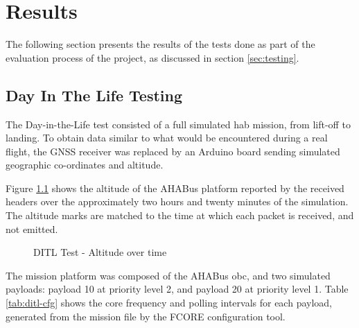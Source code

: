 \chapter{Results}
\label{ch:results}

The following section presents the results of the tests done as part of the
evaluation process of the project, as discussed in section \ref{sec:testing}.

%

\section{Day In The Life Testing}
\label{ssec:results-ditl}

The Day-in-the-Life test consisted of a full simulated \acrlong{hab} mission,
from lift-off to landing. To obtain data similar to what would be encountered
during a real flight, the GNSS receiver was replaced by an Arduino board 
sending simulated geographic co-ordinates and altitude.

Figure \ref{fig:dit-alt} shows the altitude of the AHABus platform reported by
the received headers over the approximately two hours and twenty minutes of the
simulation. The altitude marks are matched to the time at which each packet
is received, and not emitted.

\begin{figure}[h]
\centering
\caption{DITL Test - Altitude over time}
\label{fig:dit-alt}
\end{figure}

The mission platform was composed of the AHABus \acrlong{obc}, and two simulated
payloads: payload 10 at priority level 2, and payload 20 at priority level 1.
Table \ref{tab:ditl-cfg} shows the core frequency and polling intervals for
each payload, generated from the mission file by the FCORE configuration tool.

